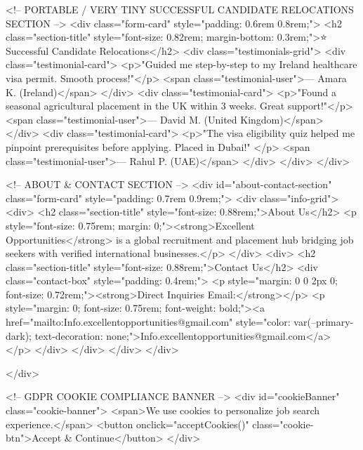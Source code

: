         <!-- PORTABLE / VERY TINY SUCCESSFUL CANDIDATE RELOCATIONS SECTION -->
        <div class="form-card" style="padding: 0.6rem 0.8rem;">
            <h2 class="section-title" style="font-size: 0.82rem; margin-bottom: 0.3rem;">⭐ Successful Candidate
                Relocations</h2>
            <div class="testimonials-grid">
                <div class="testimonial-card">
                    <p>"Guided me step-by-step to my Ireland healthcare visa permit. Smooth process!"</p>
                    <span class="testimonial-user">— Amara K. (Ireland)</span>
                </div>
                <div class="testimonial-card">
                    <p>"Found a seasonal agricultural placement in the UK within 3 weeks. Great support!"</p>
                    <span class="testimonial-user">— David M. (United Kingdom)</span>
                </div>
                <div class="testimonial-card">
                    <p>"The visa eligibility quiz helped me pinpoint prerequisites before applying. Placed in Dubai!"
                    </p>
                    <span class="testimonial-user">— Rahul P. (UAE)</span>
                </div>
            </div>
        </div>

        <!-- ABOUT & CONTACT SECTION -->
        <div id="about-contact-section" class="form-card" style="padding: 0.7rem 0.9rem;">
            <div class="info-grid">
                <div>
                    <h2 class="section-title" style="font-size: 0.88rem;">About Us</h2>
                    <p style="font-size: 0.75rem; margin: 0;"><strong>Excellent Opportunities</strong> is a global
                        recruitment and placement hub bridging job seekers with verified international businesses.</p>
                </div>
                <div>
                    <h2 class="section-title" style="font-size: 0.88rem;">Contact Us</h2>
                    <div class="contact-box" style="padding: 0.4rem;">
                        <p style="margin: 0 0 2px 0; font-size: 0.72rem;"><strong>Direct Inquiries Email:</strong></p>
                        <p style="margin: 0; font-size: 0.75rem; font-weight: bold;"><a
                                href="mailto:Info.excellentopportunities@gmail.com"
                                style="color: var(--primary-dark); text-decoration: none;">Info.excellentopportunities@gmail.com</a>
                        </p>
                    </div>
                </div>
            </div>
        </div>

    </div>

    <!-- GDPR COOKIE COMPLIANCE BANNER -->
    <div id="cookieBanner" class="cookie-banner">
        <span>We use cookies to personalize job search experience.</span>
        <button onclick="acceptCookies()" class="cookie-btn">Accept & Continue</button>
    </div>

